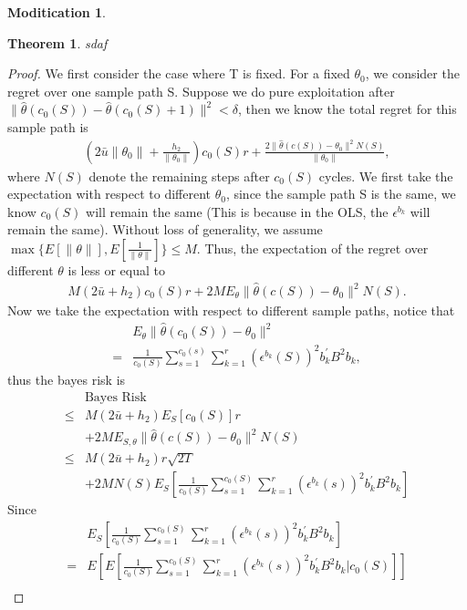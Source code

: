 \documentclass{article}
\newtheorem{theorem}{Theorem}
\theoremstyle{plain}
\theoremstyle{definition}
\newtheorem{modification}{Moditication}
\begin{document}
\begin{modification}
\begin{theorem}
sdaf
\end{theorem}
\begin{proof}
We first consider the case where T is fixed. For a fixed $\theta_{0}$, we consider the regret over one sample path S. Suppose we do pure exploitation after $\|\hat{\theta}(c_{0}(S))-\hat{\theta}(c_{0}(S)+1)\|^2<\delta$, then we know the total regret for this sample path is
\begin{align}
(2\bar{u}\|\theta_0\|+\frac{h_2}{\|\theta_0\|})c_{0}(S)r+\frac{2\|\hat{\theta}(c(S))-\theta_{0}\|^{2}N(S)}{\|\theta_{0}\|},
\end{align}
where $N(S)$ denote the remaining steps after $c_{0}(S)$ cycles. 
We first take the expectation with respect to different $\theta_{0}$, since the sample path S is the same, we know $c_{0}(S)$ will remain the same (This is because in the OLS, the $\epsilon^{b_{k}}$ will remain the same). Without loss of generality, we assume $\max\{E[\|\theta\|],E[\frac{1}{\|\theta\|}]\}\leq M$. Thus, the expectation of the regret over different $\theta$ is less or equal to
\begin{align} 
M(2\bar{u}+h_{2})c_{0}(S)r+2M E_{\theta}\|\hat{\theta}(c(S))-\theta_{0}\|^{2}N(S). \nonumber 
\end{align}
Now we take the expectation with respect to different sample paths, notice that 
\begin{align}
&E_{\theta}\|\hat{\theta}(c_{0}(S))-\theta_{0}\|^{2} \nonumber \\
= &\frac{1}{c_{0}(S)}\sum_{s=1}^{c_{0}(s)}\sum_{k=1}^{r}(\epsilon^{b_{k}}(S))^{2}b_{k}^{'}B^{2}b_{k}, \nonumber
\end{align}
thus the bayes risk is
\begin{align}
&\text{Bayes Risk} \nonumber \\
\leq &M(2\bar{u}+h_{2})E_{S}[c_{0}(S)]r \nonumber \\
& +2M E_{S,\theta}\|\hat{\theta}(c(S))-\theta_{0}\|^{2}N(S) \nonumber \\
\leq & M(2\bar{u}+h_{2})r \sqrt{2T} \nonumber \\
&+2M N(S)E_{S}[\frac{1}{c_{0}(S)}\sum_{s=1}^{c_{0}(S)}\sum_{k=1}^{r}(\epsilon^{b_{k}}(s))^{2}b_{k}^{'}B^{2}b_{k}] \nonumber
\end{align}
Since
\begin{align}
&E_{S}[\frac{1}{c_{0}(S)}\sum_{s=1}^{c_{0}(S)}\sum_{k=1}^{r}(\epsilon^{b_{k}}(s))^{2}b_{k}^{'}B^{2}b_{k}] \nonumber \\
= & E[E[\frac{1}{c_{0}(S)}\sum_{s=1}^{c_{0}(S)}\sum_{k=1}^{r}(\epsilon^{b_{k}}(s))^{2}b_{k}^{'}B^{2}b_{k}|c_{0}(S)]] \nonumber \\

\end{align}
\end{proof}
\end{modification}
\end{document}
